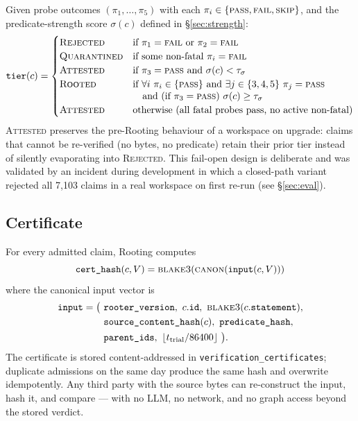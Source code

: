 \documentclass[10pt,a4paper]{article}
\begin{document}
Given probe outcomes $(\pi_1, \ldots, \pi_5)$ with each
$\pi_i \in \{\textsc{pass}, \textsc{fail}, \textsc{skip}\}$, and the
predicate-strength score $\sigma(c)$ defined in §\ref{sec:strength}:
\[
\texttt{tier}(c) =
\begin{cases}
  \textsc{Rejected}    & \text{if } \pi_1 = \textsc{fail} \text{ or } \pi_2 = \textsc{fail} \\
  \textsc{Quarantined} & \text{if some non-fatal } \pi_i = \textsc{fail} \\
  \textsc{Attested}    & \text{if } \pi_3 = \textsc{pass} \text{ and } \sigma(c) < \tau_{\sigma} \\
  \textsc{Rooted}      & \text{if } \forall i\ \pi_i \in \{\textsc{pass}\}
                          \text{ and } \exists j \in \{3,4,5\}\ \pi_j = \textsc{pass}\\[-2pt]
                       & \quad \text{and (if } \pi_3 = \textsc{pass}) \text{ } \sigma(c) \geq \tau_{\sigma} \\
  \textsc{Attested}    & \text{otherwise (all fatal probes pass, no active non-fatal)}
\end{cases}
\]
\textsc{Attested} preserves the pre-Rooting behaviour of a workspace on
upgrade: claims that cannot be re-verified (no bytes, no predicate) retain
their prior tier instead of silently evaporating into \textsc{Rejected}.
This fail-open design is deliberate and was validated by an incident during
development in which a closed-path variant rejected all 7{,}103 claims in a
real workspace on first re-run (see \S\ref{sec:eval}).

\subsection{Certificate}

For every admitted claim, Rooting computes
\[
  \texttt{cert\_hash}(c, V) = \textsc{blake3}(\textsc{canon}(\texttt{input}(c, V)))
\]
where the canonical input vector is
\begin{align*}
\texttt{input} = \big(\ &\texttt{rooter\_version},\ c.\texttt{id},\
    \textsc{blake3}(c.\texttt{statement}),\\
  & \texttt{source\_content\_hash}(c),\ \texttt{predicate\_hash},\\
  & \texttt{parent\_ids},\ \lfloor t_{\text{trial}} / 86400 \rfloor \ \big).
\end{align*}
The certificate is stored content-addressed in
\texttt{verification\_certificates}; duplicate admissions on the same day
produce the same hash and overwrite idempotently. Any third party with
the source bytes can re-construct the input, hash it, and compare --- with
no LLM, no network, and no graph access beyond the stored verdict.
\end{document}
